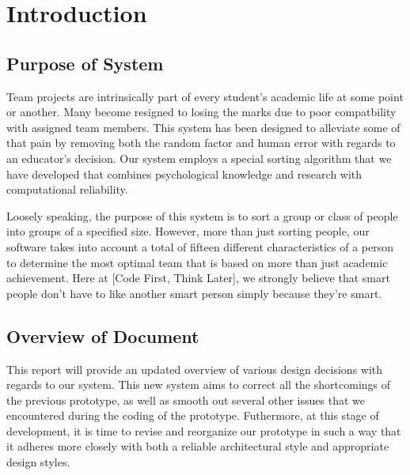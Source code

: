 \documentclass[12pt,letterpaper]{article}
\begin{document}
\newpage{}

\tableofcontents{}

\renewcommand{\listfigurename}{Figures}
\listoffigures

\renewcommand{\listtablename}{Tables}
\listoftables

\newpage{}

\section{Introduction}

\subsection{Purpose of System}

Team projects are intrinsically part of every student's academic life at some point or another. Many become resigned to losing the marks due to poor compatbility with assigned team members. This system has been designed to alleviate some of that pain by removing both the random factor and human error with regards to an educator's decision. Our system employs a special sorting algorithm that we have developed that combines psychological knowledge and research with computational reliability.

 Loosely speaking, the purpose of this system is to sort a group or class of people into groups of a specified size. However, more than just sorting people, our software takes into account a total of fifteen different characteristics of a person to determine the most optimal team that is based on more than just academic achievement. Here at [Code First, Think Later], we strongly believe that smart people don't have to like another smart person simply because they're smart.

\subsection{Overview of Document}

This report will provide an updated overview of various design decisions with regards to our system. This new system aims to correct all the shortcomings of the previous prototype, as well as smooth out several other issues that we encountered during the coding of the prototype. Futhermore, at this stage of development, it is time to revise and reorganize our prototype in such a way that it adheres more closely with both a reliable architectural style and appropriate design styles. 
\end{document}
